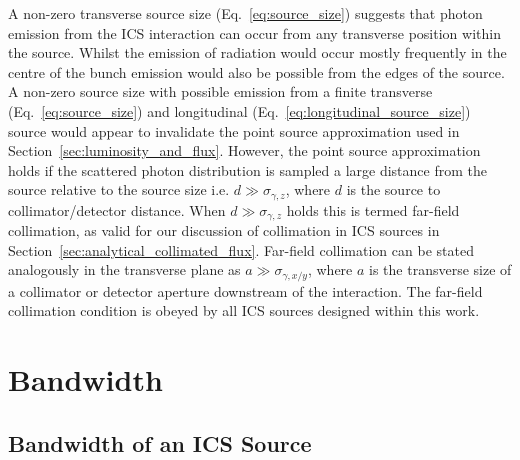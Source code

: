 \documentclass[../main.tex]{subfiles}
\begin{document}
A non-zero transverse source size (Eq.~\ref{eq:source_size}) suggests that photon emission from the ICS interaction can occur from any transverse position within the source. Whilst the emission of radiation would occur mostly frequently in the centre of the bunch emission would also be possible from the edges of the source. A non-zero source size with possible emission from a finite transverse (Eq.~\ref{eq:source_size}) and longitudinal (Eq.~\ref{eq:longitudinal_source_size}) source would appear to invalidate the point source approximation used in Section~\ref{sec:luminosity_and_flux}. However, the point source approximation holds if the scattered photon distribution is sampled a large distance from the source relative to the source size i.e. $d \gg \sigma_{\gamma,z}$, where $d$ is the source to collimator/detector distance. When $d \gg \sigma_{\gamma,z}$ holds this is termed far-field collimation, as valid for our discussion of collimation in ICS sources in Section~\ref{sec:analytical_collimated_flux}. Far-field collimation can be stated analogously in the transverse plane as $a \gg \sigma_{\gamma,x/y}$, where $a$ is the transverse size of a collimator or detector aperture downstream of the interaction. The far-field collimation condition is obeyed by all ICS sources designed within this work.  

\section{Bandwidth}
\label{sec:bandwidth}

\subsection{Bandwidth of an ICS Source}
\end{document}
